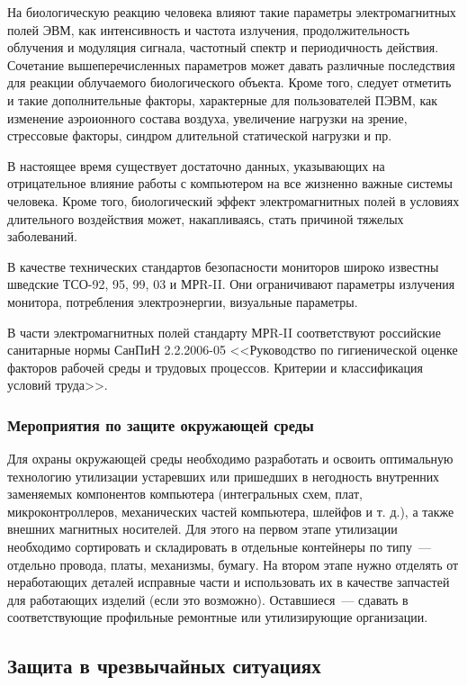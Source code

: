 На биологическую реакцию человека влияют такие параметры электромагнитных полей ЭВМ, как интенсивность и частота излучения, продолжительность облучения и модуляция сигнала, частотный спектр и периодичность действия.
Сочетание вышеперечисленных параметров может давать различные последствия для реакции облучаемого биологического объекта.
Кроме того, следует отметить и такие дополнительные факторы, характерные для пользователей ПЭВМ, как изменение аэроионного состава воздуха, увеличение нагрузки на зрение, стрессовые факторы, синдром длительной статической нагрузки и пр.

В настоящее время существует достаточно данных, указывающих на отрицательное влияние работы с компьютером на все жизненно важные системы человека.
Кроме того, биологический эффект электромагнитных полей в условиях длительного воздействия может, накапливаясь, стать причиной тяжелых заболеваний.

В качестве технических стандартов безопасности мониторов широко известны шведские ТСО-92, 95, 99, 03 и МРR-II.
Они ограничивают параметры излучения монитора, потребления электроэнергии, визуальные параметры.

В части электромагнитных полей стандарту МРR-II соответствуют российские санитарные нормы СанПиН 2.2.2006-05 <<Руководство по гигиенической оценке факторов рабочей среды и трудовых процессов. Критерии и классификация условий труда>>.

\subsubsection{Мероприятия по защите окружающей среды}
Для охраны окружающей среды необходимо разработать и освоить оптимальную технологию утилизации устаревших или пришедших в негодность внутренних заменяемых компонентов компьютера (интегральных схем, плат, микроконтроллеров, механических частей компьютера, шлейфов и т. д.), а также внешних магнитных носителей.
Для этого на первом этапе утилизации необходимо сортировать и складировать в отдельные контейнеры по типу~--- отдельно провода, платы, механизмы, бумагу.
На втором этапе нужно отделять от неработающих деталей исправные части и использовать их в качестве запчастей для работающих изделий (если это возможно).
Оставшиеся~--- сдавать в соответствующие профильные ремонтные или утилизирующие организации.


\subsection{Защита в чрезвычайных ситуациях}

